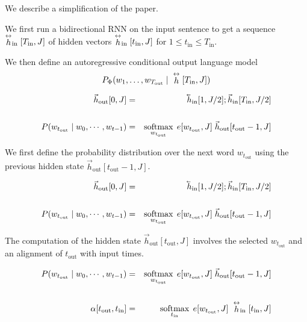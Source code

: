 {\vfill
We describe a simplification of the paper.

We first run a bidirectional RNN on the
input sentence to get a sequence $\stackrel{\leftrightarrow}{h}_\mathrm{in}[T_{\mathrm{in}},J]$ of hidden vectors $\stackrel{\leftrightarrow}{h}_\mathrm{in}[t_\mathrm{in},J]$ for $1 \leq t_\mathrm{in} \leq T_{\mathrm{in}}$.

\vfill
We then define an autoregressive conditional output language model
$$P_\Phi(w_1,\ldots,w_{T_\mathrm{out}}\;|\; \stackrel{\leftrightarrow}{h}[T_{\mathrm{in}},J])$$

\begin{eqnarray*}
  \vec{h}_\mathrm{out}[0,J] & = & \cev{h}_\mathrm{in}[1,J/2];\vec{h}_\mathrm{in}[T_\mathrm{in},J/2] \\
  \\
   P(w_{t_\mathrm{out}}\;|\;w_0,\cdots,w_{t-1})
   & = & \softmax_{w_{t_\mathrm{out}}}\;e[w_{t_\mathrm{out}},J]\;\vec{h}_\mathrm{out}[t_\mathrm{out}-1,J]
\end{eqnarray*}

\vfill
We first define the probability distribution over the next word $w_{t_\mathrm{out}}$ using the previous hidden state $\vec{h}_\mathrm{out}[t_\mathrm{out}-1,J]$.

\begin{eqnarray*}
  \vec{h}_\mathrm{out}[0,J] & = & \cev{h}_\mathrm{in}[1,J/2];\vec{h}_\mathrm{in}[T_\mathrm{in},J/2] \\
  \\
   P(w_{t_\mathrm{out}}\;|\;w_0,\cdots,w_{t-1})
   & = & \softmax_{w_{t_\mathrm{out}}}\;e[w_{t_\mathrm{out}},J]\;\vec{h}_\mathrm{out}[t_\mathrm{out}-1,J]
\end{eqnarray*}

\vfill
The computation of the hidden state $\vec{h}_\mathrm{out}[t_\mathrm{out},J]$ involves the selected $w_{t_\mathrm{out}}$ and an alignment of $t_\mathrm{out}$ with input times.

\begin{eqnarray*}
 P(w_{t_\mathrm{out}}\;|\;w_0,\cdots,w_{t-1})
   & = & \operatorname*{softmax}_{w_{t_\mathrm{out}}}\;e[w_{t_\mathrm{out}},J]\;\vec{h}_\mathrm{out}[t_\mathrm{out}-1,J] \\
  \\
  \alpha[t_\mathrm{out},t_{\mathrm{in}}]& =& \operatorname*{softmax}_{t_\mathrm{in}} \;e[w_{t_\mathrm{out}},J]\;\stackrel{\leftrightarrow}{h}_\mathrm{in}[t_{\mathrm{in}},J]
\end{eqnarray*}

}
